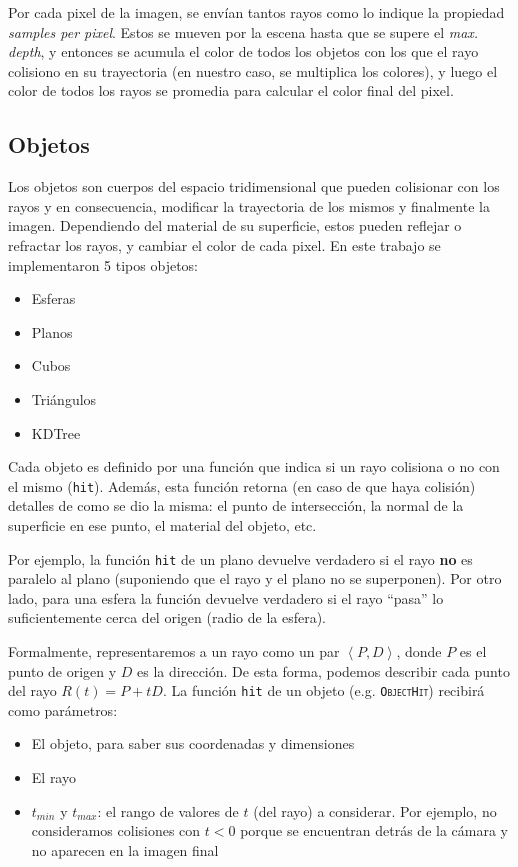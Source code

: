 Por cada pixel de la imagen, se envían tantos rayos como lo indique la propiedad
\textit{samples per pixel}. Estos se mueven por la escena hasta que se supere el
\textit{max. depth}, y entonces se acumula el color de todos los objetos con los
que el rayo colisiono en su trayectoria (en nuestro caso, se multiplica los
colores), y luego el color de todos los rayos se promedia para calcular el color
final del pixel.

\subsection{Objetos}

Los objetos son cuerpos del espacio tridimensional que pueden colisionar con los
rayos y en consecuencia, modificar la trayectoria de los mismos y finalmente  la
imagen. Dependiendo del material de su superficie, estos pueden reflejar o
refractar los rayos, y cambiar el color de cada pixel. En este trabajo se
implementaron 5 tipos objetos:

\begin{itemize}
    \item Esferas
    \item Planos
    \item Cubos
    \item Triángulos
    \item KDTree
\end{itemize}

Cada objeto es definido por una función que indica si un rayo colisiona o no con
el mismo (\texttt{hit}). Además, esta función retorna (en caso de que haya
colisión) detalles de como se dio la misma: el punto de intersección, la normal
de la superficie en ese punto, el material del objeto, etc.

Por ejemplo, la función \texttt{hit} de un plano devuelve verdadero si el rayo
\textbf{no} es paralelo al plano (suponiendo que el rayo y el plano no se
superponen). Por otro lado, para una esfera la función devuelve verdadero si el
rayo ``pasa'' lo suficientemente cerca del origen (radio de la esfera).

Formalmente, representaremos a un rayo como un par
$\left\langle P, D \right\rangle$, donde $P$ es el punto de origen y $D$ es la
dirección. De esta forma, podemos describir cada punto del rayo $R(t) = P + tD$.
La función \texttt{hit} de un objeto (e.g. \textsc{\texttt{ObjectHit}}) recibirá
como parámetros:

\begin{itemize}
    \item El objeto, para saber sus coordenadas y dimensiones
    \item El rayo
    \item $t_{min}$ y $t_{max}$: el rango de valores de $t$ (del rayo) a
        considerar. Por ejemplo, no consideramos colisiones con $t < 0$ porque
        se encuentran detrás de la cámara y no aparecen en la imagen final
\end{itemize}

